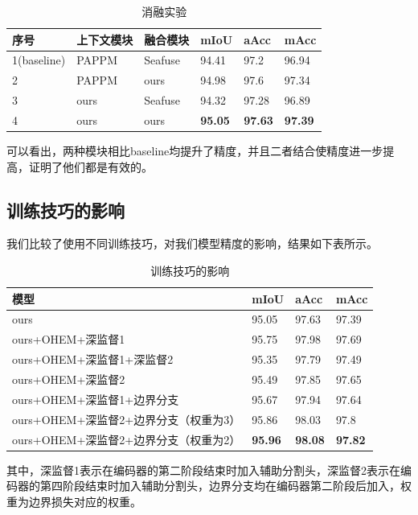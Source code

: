 \documentclass[11pt]{article}
\begin{document}
\begin{table}[h]
  \centering
  \begin{tabular}{|l|l|l|l|l|l|}
  \hline
      序号 & 上下文模块 & 融合模块 & mIoU & aAcc & mAcc \\ \hline
      1(baseline) & PAPPM & Seafuse & 94.41 & 97.2 & 96.94 \\ \hline
      2 & PAPPM & ours & 94.98 & 97.6 & 97.34 \\ \hline
      3 & ours & Seafuse & 94.32 & 97.28 & 96.89 \\ \hline
      4 & ours & ours & \textbf{95.05} & \textbf{97.63} & \textbf{97.39} \\ \hline
  \end{tabular}
  \caption{消融实验}
\end{table}

可以看出，两种模块相比baseline均提升了精度，并且二者结合使精度进一步提高，证明了他们都是有效的。
\subsection{训练技巧的影响}

我们比较了使用不同训练技巧，对我们模型精度的影响，结果如下表所示。
\begin{table}[H]
  \centering
  \begin{tabular}{|l|l|l|l|}
  \hline
      模型 & mIoU & aAcc & mAcc \\ \hline
      ours & 95.05 & 97.63 & 97.39 \\ \hline
      ours+OHEM+深监督1 & 95.75 & 97.98 & 97.69 \\ \hline
      ours+OHEM+深监督1+深监督2 & 95.35 & 97.79 & 97.49 \\ \hline
      ours+OHEM+深监督2 & 95.49 & 97.85 & 97.65 \\ \hline
      ours+OHEM+深监督1+边界分支 & 95.67 & 97.94 & 97.64 \\ \hline
      ours+OHEM+深监督2+边界分支（权重为3） & 95.86 & 98.03 & 97.8 \\ \hline
      ours+OHEM+深监督2+边界分支（权重为2） & \textbf{95.96} & \textbf{98.08} & \textbf{97.82} \\ \hline
  \end{tabular}
  \caption{训练技巧的影响}
\end{table}

其中，深监督1表示在编码器的第二阶段结束时加入辅助分割头，深监督2表示在编码器的第四阶段结束时加入辅助分割头，边界分支均在编码器第二阶段后加入，权重为边界损失对应的权重。
\end{document}
